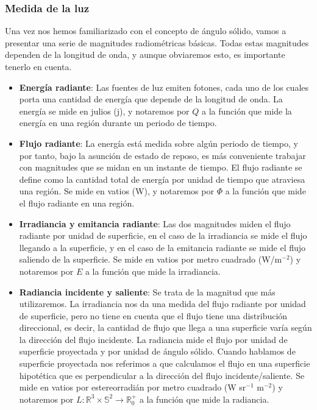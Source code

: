 \subsubsection*{Medida de la luz}

Una vez nos hemos familiarizado con el concepto de ángulo sólido, vamos a presentar una serie de magnitudes radiométricas básicas. Todas estas magnitudes dependen de la longitud de onda, y aunque obviaremos esto, es importante tenerlo en cuenta.

\begin{itemize}
\item \textbf{Energía radiante}: Las fuentes de luz emiten fotones, cada uno de los cuales porta una cantidad de energía que depende de la longitud de onda. La energía se mide en julios (j), y notaremos por $Q$ a la función que mide la energía en una región durante un periodo de tiempo.
\item \textbf{Flujo radiante}: La energía está medida sobre algún periodo de tiempo, y por tanto, bajo la asunción de estado de reposo, es más conveniente trabajar con magnitudes que se midan en un instante de tiempo. El flujo radiante se define como la cantidad total de energía por unidad de tiempo que atraviesa una región. Se mide en vatios (W), y notaremos por $\Phi$ a la función que mide el flujo radiante en una región.
\item \textbf{Irradiancia y emitancia radiante}: Las dos magnitudes miden el flujo radiante por unidad de superficie, en el caso de la irradiancia se mide el flujo llegando a la superficie, y en el caso de la emitancia radiante se mide el flujo saliendo de la superficie. Se mide en vatios por metro cuadrado (W/m$^{-2}$) y notaremos por $E$ a la función que mide la irradiancia.

\item \textbf{Radiancia incidente y saliente}: Se trata de la magnitud que más utilizaremos. La irradiancia nos da una medida del flujo radiante por unidad de superficie, pero no tiene en cuenta que el flujo tiene una distribución direccional, es decir, la cantidad de flujo que llega a una superficie varía según la dirección del flujo incidente. La radiancia mide el flujo por unidad de superficie proyectada y por unidad de ángulo sólido. Cuando hablamos de superficie proyectada nos referimos a que calculamos el flujo en una superficie hipotética que es perpendicular a la dirección del flujo incidente/saliente. Se mide en vatios por estereorradián por metro cuadrado (W sr$^{-1}$ m$^{-2}$) y notaremos por $L: \mathds{R}^3 \times \mathds{S}^2\rightarrow \mathds{R}^+_0$ a la función que mide la radiancia.


\end{itemize}
